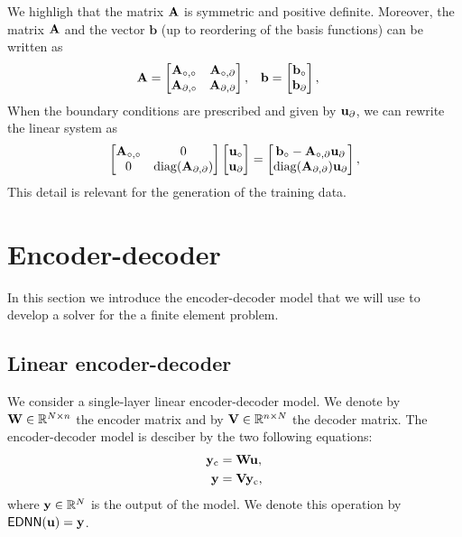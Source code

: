 We highligh that the matrix \(\mathbf{A}\) is symmetric and positive definite.
Moreover, the matrix \(\mathbf{A}\) and the vector \(\mathbf{b}\) (up to reordering of the basis functions) can be written as
\begin{align*}
    \mathbf{A} & = \begin{bmatrix}
        \mathbf{A}_{\circ, \circ} & \mathbf{A}_{\circ, \partial} \\
        \mathbf{A}_{\partial, \circ} & \mathbf{A}_{\partial, \partial}
    \end{bmatrix}, &
    \mathbf{b} & = \begin{bmatrix}
        \mathbf{b}_{\circ} \\
        \mathbf{b}_{\partial}
    \end{bmatrix},
\end{align*}
When the boundary conditions are prescribed and given by \(\mathbf{u}_{\partial}\), we can rewrite the linear system as
\begin{equation}
    \begin{bmatrix}
        \mathbf{A}_{\circ, \circ} & 0 \\
        0 & \operatorname{diag}(\mathbf{A}_{\partial, \partial})
    \end{bmatrix}
    \begin{bmatrix}
        \mathbf{u}_{\circ} \\
        \mathbf{u}_{\partial}
    \end{bmatrix}
    =
    \begin{bmatrix}
        \mathbf{b}_{\circ} - \mathbf{A}_{\circ, \partial} \mathbf{u}_{\partial} \\
        \operatorname{diag}(\mathbf{A}_{\partial, \partial}) \mathbf{u}_{\partial}
    \end{bmatrix},
\end{equation}
This detail is relevant for the generation of the training data.

\section{Encoder-decoder}
\label{sec:e-d}

In this section we introduce the encoder-decoder model that we will use to develop a solver for the a finite element problem.

\subsection{Linear encoder-decoder}

We consider a single-layer linear encoder-decoder model.
We denote by \(\mathbf{W} \in \mathbb{R}^{N \times n}\) the encoder matrix and by \(\mathbf{V} \in \mathbb{R}^{n \times N}\) the decoder matrix.
The encoder-decoder model is desciber by the two following equations:
\begin{subequations}
    \begin{align}
        \mathbf{y}_\mathrm{c} & = \mathbf{W} \mathbf{u}, \\
        \mathbf{y} & = \mathbf{V} \mathbf{y}_\mathrm{c},
    \end{align}
\end{subequations}
where \(\mathbf{y} \in \mathbb{R}^{N}\) is the output of the model.
We denote this operation by \(\mathsf{EDNN}(\mathbf{u}) = \mathbf{y}\).

